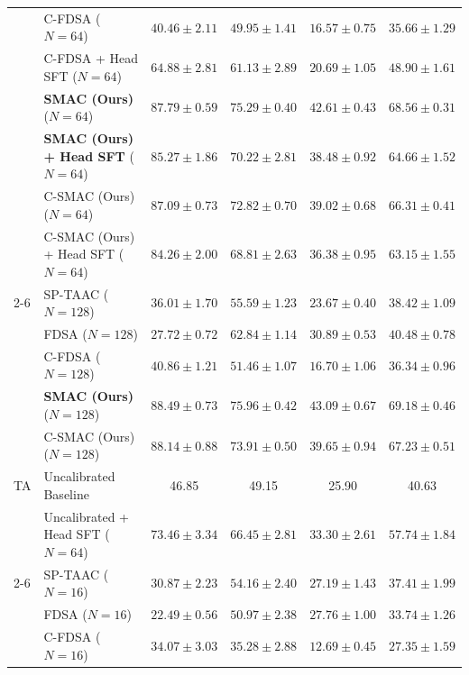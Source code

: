 \documentclass{article}
\theoremstyle{plain}
\theoremstyle{definition}
\theoremstyle{remark}
\begin{document}
\begin{table}[!t]
\begin{center}
\begin{scriptsize}
\begin{sc}
\begin{tabular}{llcccc}
                 & C-FDSA ($N = 64$) & $40.46 \pm 2.11$ & $49.95 \pm 1.41$ & $16.57 \pm 0.75$ & $35.66 \pm 1.29$ \\
                 & C-FDSA + Head SFT ($N = 64$) & $64.88 \pm 2.81$ & $61.13 \pm 2.89$ & $20.69 \pm 1.05$ & $48.90 \pm 1.61$ \\
                 & \textbf{SMAC (Ours)} ($N = 64$) & \textbf{$87.79 \pm 0.59$} & \textbf{$75.29 \pm 0.40$} & \textbf{$42.61 \pm 0.43$} & \textbf{$68.56 \pm 0.31$} \\
                 & \textbf{SMAC (Ours) + Head SFT} ($N = 64$) & $85.27 \pm 1.86$ & $70.22 \pm 2.81$ & $38.48 \pm 0.92$ & $64.66 \pm 1.52$ \\
                 & C-SMAC (Ours) ($N = 64$) & $87.09 \pm 0.73$ & $72.82 \pm 0.70$ & $39.02 \pm 0.68$ & $66.31 \pm 0.41$ \\
                 & C-SMAC (Ours) + Head SFT ($N = 64$) & $84.26 \pm 2.00$ & $68.81 \pm 2.63$ & $36.38 \pm 0.95$ & $63.15 \pm 1.55$ \\
\cmidrule{2-6}
                 & SP-TAAC ($N = 128$) & $36.01 \pm 1.70$ & $55.59 \pm 1.23$ & $23.67 \pm 0.40$ & $38.42 \pm 1.09$ \\
                 & FDSA ($N = 128$) & $27.72 \pm 0.72$ & $62.84 \pm 1.14$ & $30.89 \pm 0.53$ & $40.48 \pm 0.78$ \\
                 & C-FDSA ($N = 128$) & $40.86 \pm 1.21$ & $51.46 \pm 1.07$ & $16.70 \pm 1.06$ & $36.34 \pm 0.96$ \\
                 & \textbf{SMAC (Ours)} ($N = 128$) & \textbf{$88.49 \pm 0.73$} & \textbf{$75.96 \pm 0.42$} & \textbf{$43.09 \pm 0.67$} & \textbf{$69.18 \pm 0.46$} \\
                 & C-SMAC (Ours) ($N = 128$) & $88.14 \pm 0.88$ & $73.91 \pm 0.50$ & $39.65 \pm 0.94$ & $67.23 \pm 0.51$ \\
\midrule
TA & Uncalibrated Baseline & 46.85 & 49.15 & 25.90 & 40.63 \\
                 & Uncalibrated + Head SFT ($N = 64$) & $73.46 \pm 3.34$ & $66.45 \pm 2.81$ & $33.30 \pm 2.61$ & $57.74 \pm 1.84$ \\
\cmidrule{2-6}
                 & SP-TAAC ($N = 16$) & $30.87 \pm 2.23$ & $54.16 \pm 2.40$ & $27.19 \pm 1.43$ & $37.41 \pm 1.99$ \\
                 & FDSA ($N = 16$) & $22.49 \pm 0.56$ & $50.97 \pm 2.38$ & $27.76 \pm 1.00$ & $33.74 \pm 1.26$ \\
                 & C-FDSA ($N = 16$) & $34.07 \pm 3.03$ & $35.28 \pm 2.88$ & $12.69 \pm 0.45$ & $27.35 \pm 1.59$ \\

\end{tabular}
\end{sc}
\end{scriptsize}
\end{center}
\end{table}
\end{document}
